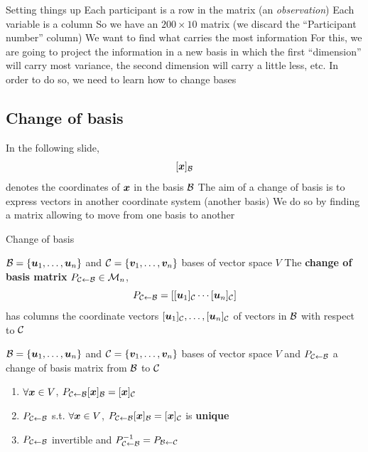 \documentclass[aspectratio=169]{beamer}\usepackage[]{graphicx}\usepackage[]{xcolor}
\begin{document}
\begin{frame}{Setting things up}
Each participant is a row in the matrix (an \emph{observation})
\vfill
Each variable is a column
\vfill
So we have an $200\times 10$ matrix (we discard the ``Participant number'' column)
\vfill
We want to find what carries the most information
\vfill
For this, we are going to project the information in a new basis in which the first ``dimension'' will carry most variance, the second dimension will carry a little less, etc.
\vfill
In order to do so, we need to learn how to change bases
\end{frame}

\subsection{Change of basis}
\begin{frame}
	In the following slide, 
	\[
	[\bm{x}]_{\mathcal{B}}
	\]
	denotes the coordinates of $\bm{x}$ in the basis $\mathcal{B}$
	\vfill
	The aim of a change of basis is to express vectors in another coordinate system (another basis)
	\vfill
	We do so by finding a matrix allowing to move from one basis to another
\end{frame}

\begin{frame}{Change of basis}
\begin{definition}
$\mathcal{B}=\{\bm{u}_1,\ldots,\bm{u}_n\}$ and $\mathcal{C}=\{\bm{v}_1,\ldots,\bm{v}_n\}$ bases of vector space $V$
\vfill
The \textbf{change of basis matrix} $P_{\mathcal{C}\leftarrow\mathcal{B}}\in\mathcal{M}_n$,
\[
P_{\mathcal{C}\leftarrow\mathcal{B}}
=\left[
[\bm{u}_1]_{\mathcal{C}} \cdots [\bm{u}_n]_{\mathcal{C}}
\right]
\]
has columns the coordinate vectors $[\bm{u}_1]_{\mathcal{C}},\ldots,[\bm{u}_n]_{\mathcal{C}}$ of vectors in $\mathcal{B}$ with respect to $\mathcal{C}$
\end{definition}
\vfill
\begin{theorem}
$\mathcal{B}=\{\bm{u}_1,\ldots,\bm{u}_n\}$ and $\mathcal{C}=\{\bm{v}_1,\ldots,\bm{v}_n\}$ bases of vector space $V$ and $P_{\mathcal{C}\leftarrow\mathcal{B}}$ a change of basis matrix from $\mathcal{B}$ to $\mathcal{C}$
\begin{enumerate}
\item $\forall\bm{x}\in V$, $P_{\mathcal{C}\leftarrow\mathcal{B}}[\bm{x}]_{\mathcal{B}} = [\bm{x}]_{\mathcal{C}}$
\item $P_{\mathcal{C}\leftarrow\mathcal{B}}$ s.t. $\forall\bm{x}\in V$, $P_{\mathcal{C}\leftarrow\mathcal{B}}[\bm{x}]_{\mathcal{B}} = [\bm{x}]_{\mathcal{C}}$ is \textbf{unique}
\item $P_{\mathcal{C}\leftarrow\mathcal{B}}$ invertible and $P_{\mathcal{C}\leftarrow\mathcal{B}}^{-1}=P_{\mathcal{B}\leftarrow\mathcal{C}}$
\end{enumerate}
\end{theorem}
\end{frame}
\end{document}
